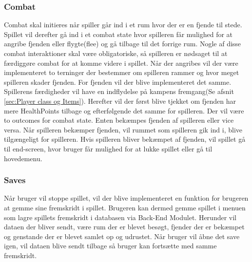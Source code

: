 \subsubsection{Combat}
\label{sec:Combat-design}
Combat skal initieres når spiller går ind i et rum hvor der er en fjende til stede. Spillet vil derefter gå ind i et combat state hvor spilleren får mulighed for at angribe fjenden eller flygte(flee) og gå tilbage til det forrige rum. Nogle af disse combat interaktioner skal være obligatoriske, så spilleren er nødsaget til at færdiggøre combat for at komme videre i spillet. Når der angribes vil der være implementeret to terninger der bestemmer om spilleren rammer og hvor meget spilleren skader fjenden. For fjenden vil der blive implementeret det samme. Spillerens færdigheder vil have en indflydelse på kampens fremgang(Se afsnit \autoref{sec:Player class og Items}). Herefter vil der først blive tjekket om fjenden har mere HealthPoints tilbage og efterfølgende det samme for spilleren. Der vil være to outcomes for combat state. Enten bekæmpes fjenden af spilleren eller vice versa. Når spilleren bekæmper fjenden, vil rummet som spilleren gik ind i, blive tilgængeligt for spilleren. Hvis spilleren bliver bekæmpet af fjenden, vil spillet gå til end-screen, hvor bruger får mulighed for at lukke spillet eller gå til hovedemenu.

\subsubsection{Saves}
Når bruger vil stoppe spillet, vil der blive implementeret en funktion for brugeren at gemme sine fremskridt i spillet. Brugeren kan dermed gemme spillet i menuen som lagre spillets fremskridt i databasen via Back-End Modulet. Herunder vil dataen der bliver sendt, være rum der er blevet besøgt, fjender der er bekæmpet og genstande der er blevet samlet op og udrustet. Når bruger vil åbne det save igen, vil dataen blive sendt tilbage så bruger kan fortsætte med samme fremskridt.